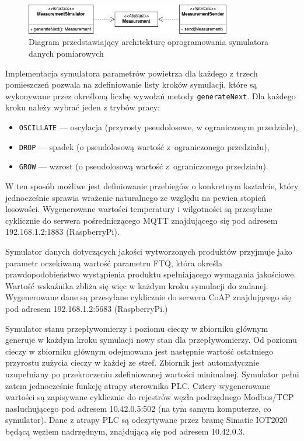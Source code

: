 \documentclass[a4paper, 12pt, twoside]{article}
\begin{document}
\begin{figure}[h]
      \centering
      \includegraphics[width=0.8\textwidth]{iot-sim-architecture.png}
      \caption{Diagram przedstawiający architekturę oprogramowania symulatora danych pomiarowych}
      \label{fig:iot-sim}
\end{figure}

Implementacja symulatora parametrów powietrza dla każdego z trzech pomieszczeń 
pozwala na zdefiniowanie listy kroków
symulacji, które są wykonywane przez określoną liczbę wywołań metody
\texttt{generateNext}. Dla każdego kroku należy wybrać jeden z trybów pracy:
\begin{itemize}
      \itemsep0em
      \item \texttt{OSCILLATE} --- oscylacja (przyrosty pseudolosowe, w ograniczonym przedziale),
      \item \texttt{DROP} --- spadek (o pseudolosową wartość z~ograniczonego przedziału),
      \item \texttt{GROW} --- wzrost (o pseudolosową wartość z~ograniczonego przedziału).
\end{itemize}
\noindent W ten sposób możliwe jest definiowanie przebiegów o konkretnym kształcie,
który jednocześnie sprawia wrażenie naturalnego ze względu na pewien stopień losowości. Wygenerowane 
wartości temperatury i wilgotności są przesyłane cyklicznie do serwera pośredniczącego MQTT znajdującego
się pod adresem 192.168.1.2:1883 (RaspberryPi).

Symulator danych dotyczących jakości wytworzonych produktów przyjmuje jako parametr
oczekiwaną wartość parametru FTQ, która określa prawdopodobieństwo wystąpienia
produktu spełniającego wymagania jakościowe. Wartość wskaźnika zbliża się więc
w każdym kroku symulacji do zadanej. Wygenerowane dane są przesyłane cyklicznie
do serwera CoAP znajdującego się pod adresem 192.168.1.2:5683 (RaspberryPi.)

Symulator stanu przepływomierzy i poziomu cieczy w zbiorniku głównym generuje 
w każdym kroku symulacji nowy stan dla przepływomierzy. Od poziomu cieczy w zbiorniku głównym
odejmowana jest następnie wartość ostatniego przyrostu zużycia cieczy w każdej ze stref. 
Zbiornik jest automatycznie uzupełniany po przekroczeniu zdefiniowanej wartości minimalnej.
Symulator pełni zatem jednocześnie funkcję atrapy sterownika PLC. Cztery wygenerowane
wartości są zapisywane cyklicznie do rejestrów węzła podrzędnego Modbus/TCP nasłuchującego
pod adresem 10.42.0.5:502 (na tym samym komputerze, co symulator). Dane 
z atrapy PLC są odczytywane przez bramę Simatic IOT2020 będącą węzłem nadrzędnym, 
znajdującą się pod adresem 10.42.0.3. 
\end{document}
